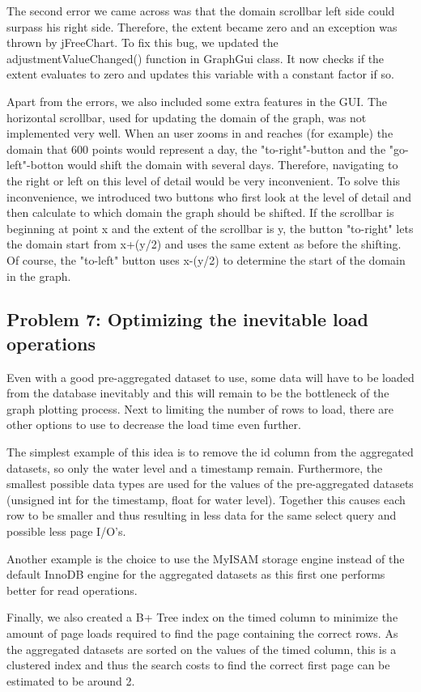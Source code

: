 The second error we came across was that the domain scrollbar left side could surpass his right side. Therefore, the extent became zero and an exception was thrown by jFreeChart. To fix this bug, we updated the adjustmentValueChanged() function in GraphGui class. It now checks if the extent evaluates to zero and updates this variable with a constant factor if so.

Apart from the errors, we also included some extra features in the GUI. The horizontal scrollbar, used for updating the domain of the graph, was not implemented very well. When an user zooms in and reaches (for example) the domain that 600 points would represent a day, the "to-right"-button and the "go-left"-botton would shift the domain with several days. Therefore, navigating to the right or left on this level of detail would be very inconvenient.
To solve this inconvenience, we introduced two buttons who first look at the level of detail and then calculate to which domain the graph should be shifted. If the scrollbar is beginning at point x and the extent of the scrollbar is y, the button "to-right" lets the domain start from x+(y/2) and uses the same extent as before the shifting. Of course, the "to-left" button uses x-(y/2) to determine the start of the domain in the graph.

\subsection{Problem 7: Optimizing the inevitable load operations}
Even with a good pre-aggregated dataset to use, some data will have to be loaded from the database inevitably and this will remain to be the bottleneck of the graph plotting process. Next to limiting the number of rows to load, there are other options to use to decrease the load time even further. 

The simplest example of this idea is to remove the id column from the aggregated datasets, so only the water level and a timestamp remain. Furthermore, the smallest possible data types are used for the values of the pre-aggregated datasets (unsigned int for the timestamp, float for water level). Together this causes each row to be smaller and thus resulting in less data for the same select query and possible less page I/O's.

Another example is the choice to use the MyISAM storage engine instead of the default InnoDB engine for the aggregated datasets as this first one performs better for read operations.

Finally, we also created a B+ Tree index on the timed column to minimize the amount of page loads required to find the page containing the correct rows. As the aggregated datasets are sorted on the values of the timed column, this is a clustered index and thus the search costs to find the correct first page can be estimated to be around 2. 
